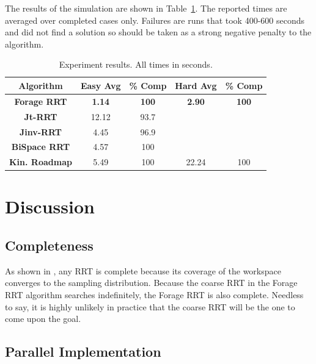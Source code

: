 \documentclass[conference]{IEEEtran}
\begin{document}
The results of the simulation are shown in Table~\ref{tab:Results}. The reported times are averaged over completed cases only. Failures
are runs that took 400-600 seconds and did not find a solution so should be taken as a strong negative penalty to the algorithm.

\begin{table}
        \centering
        \begin{tabular}{| c | c | c | c | c | }
		\hline
                Algorithm & \textbf{Easy Avg} & \textbf{\% Comp} & \textbf{Hard Avg} & \textbf{\% Comp}\\  \hline
                \textbf{Forage RRT}&\textbf{1.14}&\textbf{100}&\textbf{2.90}&\textbf{100}\\ \hline
                \textbf{Jt-RRT}&12.12&93.7 & & \\ \hline
                \textbf{Jinv-RRT}&4.45&96.9& & \\ \hline
		\textbf{BiSpace RRT}&4.57&100& & \\ \hline
   		\textbf{Kin. Roadmap}&5.49&100&22.24&100\\ \hline
        \end{tabular}
        \caption{Experiment results. All times in seconds.}
        \label{tab:Results}
\end{table}

\section{Discussion}
\subsection{Completeness}
As shown in \cite{lavalle00}, any RRT is complete because its coverage of the workspace converges to the sampling distribution. Because the
coarse RRT in the Forage RRT algorithm searches indefinitely, the Forage RRT is also complete. Needless to say, it is highly unlikely in
practice that the coarse RRT will be the one to come upon the goal.

\subsection{Parallel Implementation}
\end{document}
